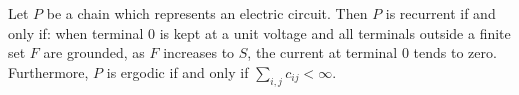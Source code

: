 Let $P$ be a chain which represents an electric circuit. Then $P$ is recurrent if and only if: when terminal $0$ is kept at a unit voltage and all terminals outside a finite set $F$ are grounded, as $F$ increases to $S$, the current at terminal $0$ tends to zero. Furthermore, $P$ is ergodic if and only if $\sum_{i,j} c_{ij} < \infty$.
